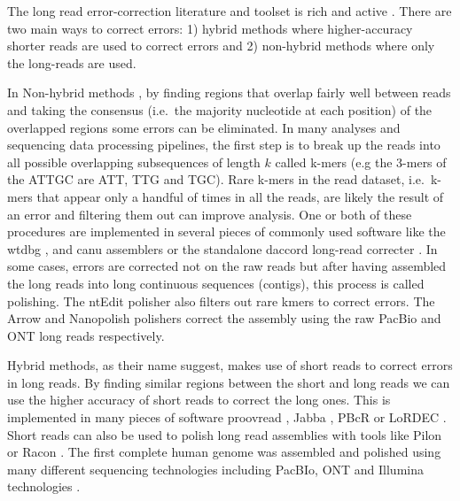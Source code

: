 \documentclass[
  11pt,
  twoside]{scrbook}
\begin{document}
The long read error-correction literature and toolset is rich and active \autocite{limaComparativeAssessmentLongread2020,fuComparativeEvaluationHybrid2019,zhangComprehensiveEvaluationLong2020}. There are two main ways to correct errors: 1) hybrid methods where higher-accuracy shorter reads are used to correct errors and 2) non-hybrid methods where only the long-reads are used.

In Non-hybrid methods \autocite{limaComparativeAssessmentLongread2020,amarasingheOpportunitiesChallengesLongread2020}, by finding regions that overlap fairly well between reads and taking the consensus (i.e.~the majority nucleotide at each position) of the overlapped regions some errors can be eliminated. In many analyses and sequencing data processing pipelines, the first step is to break up the reads into all possible overlapping subsequences of length \(k\) called k-mers (e.g the 3-mers of the ATTGC are ATT, TTG and TGC). Rare k-mers in the read dataset, i.e.~k-mers that appear only a handful of times in all the reads, are likely the result of an error and filtering them out can improve analysis. One or both of these procedures are implemented in several pieces of commonly used software like the wtdbg \autocite{ruanFastAccurateLongread2020}, and canu \autocite{korenCanuScalableAccurate2017} assemblers or the standalone daccord long-read correcter \autocite{tischlerNonHybridLong2017}. In some cases, errors are corrected not on the raw reads but after having assembled the long reads into long continuous sequences (contigs), this process is called polishing. The ntEdit polisher \autocite{warrenNtEditScalableGenome2019} also filters out rare kmers to correct errors. The Arrow \autocite{heplerImprovedCircularConsensus2016} and Nanopolish \autocite{simpsonDetectingDNACytosine2017} polishers correct the assembly using the raw PacBio and ONT long reads respectively.

Hybrid methods, as their name suggest, makes use of short reads to correct errors in long reads. By finding similar regions between the short and long reads we can use the higher accuracy of short reads to correct the long ones. This is implemented in many pieces of software proovread \autocite{hacklProovreadLargescaleHighaccuracy2014}, Jabba \autocite{miclotteJabbaHybridError2016}, PBcR \autocite{korenHybridErrorCorrection2012} or LoRDEC \autocite{salmelaLoRDECAccurateEfficient2014}. Short reads can also be used to polish long read assemblies with tools like Pilon \autocite{walkerPilonIntegratedTool2014} or Racon \autocite{vaserFastAccurateNovo2017}. The first complete human genome was assembled and polished using many different sequencing technologies including PacBIo, ONT and Illumina technologies \autocite{nurk2022}.
\end{document}
